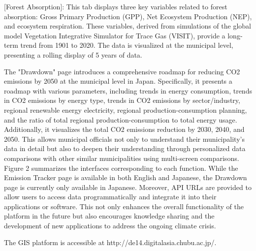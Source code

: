[Forest Absorption]: This tab displays three key variables related to forest absorption: Gross Primary Production (GPP), Net Ecosystem Production (NEP), and ecosystem respiration. These variables, derived from simulations of the global model Vegetation Integrative Simulator for Trace Gas (VISIT), provide a long-term trend from 1901 to 2020. The data is visualized at the municipal level, presenting a rolling display of 5 years of data.\par

The "Drawdown" page introduces a comprehensive roadmap for reducing CO2 emissions by 2050 at the municipal level in Japan. Specifically, it presents a roadmap with various parameters, including trends in energy consumption, trends in CO2 emissions by energy type, trends in CO2 emissions by sector/industry, regional renewable energy electricity, regional production-consumption planning, and the ratio of total regional production-consumption to total energy usage. Additionally, it visualizes the total CO2 emissions reduction by 2030, 2040, and 2050. This allows municipal officials not only to understand their municipality's data in detail but also to deepen their understanding through personalized data comparisons with other similar municipalities using multi-screen comparisons. Figure 2 summarizes the interfaces corresponding to each function. While the Emission Tracker page is available in both English and Japanese, the Drawdown page is currently only available in Japanese. Moreover, API URLs are provided to allow users to access data programmatically and integrate it into their applications or software. This not only enhances the overall functionality of the platform in the future but also encourages knowledge sharing and the development of new applications to address the ongoing climate crisis. \par
The GIS platform is accessible at http://de14.digitalasia.chubu.ac.jp/.\par

